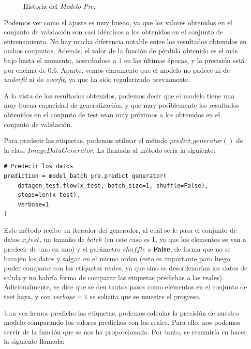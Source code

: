 \documentclass[11pt,a4paper]{article}
\begin{document}
\begin{figure}[H]
\begin{subfigure}{.5\textwidth}
    \label{fig:final-acc}
  \end{subfigure}
  \caption{Historia del \textit{Modelo Pre}.}
  \label{fig:history-final}
\end{figure}

Podemos ver como el ajuste es muy bueno, ya que los valores obtenidos en el conjunto de validación
son casi idénticos a los obtenidos en el conjunto de entrenamiento. No hay mucha diferencia notable
entre los resultados obtenidos en ambos conjuntos. Además, el valor de la función de pérdida obtenido es el más
bajo hasta el momento, acercándose a 1 en las últimas épocas, y la precisión está por encima de 0.6.
Aparte, vemos claramente que el modelo no padece ni de \textit{underfit} ni de \textit{overfit}, ya que
ha sido regularizado previamente.

A la vista de los resultados obtenidos, podemos decir que el modelo tiene una muy buena capacidad
de generalización, y que muy posiblemente los resultados obtenidos en el conjunto de test sean
muy próximos a los obtenidos en el conjunto de validación.

Para predecir las etiquetas, podemos utilizar el método $predict\_generator()$ de la clase
$ImageDataGenerator$. La llamada al método sería la siguiente:

\begin{lstlisting}
# Predecir los datos
prediction = model_batch_pre.predict_generator(
    datagen_test.flow(x_test, batch_size=1, shuffle=False),
    steps=len(x_test),
    verbose=1
)
\end{lstlisting}

Este método recibe un iterador del generador, al cuál se le pasa el conjunto de datos $x\_test$, un 
tamaño de \textit{batch} (en este caso es 1, ya que los elementos se van a predecir de uno en uno) y
el parámetro $shuffle$ a \textbf{False}, de forma que no se barajen los datos y salgan en el mismo orden
(esto es importante para luego poder comparar con las etiquetas reales, ya que sino se desordenarían
los datos de salida y no habría forma de comparar las etiquetas predichas a las reales). Adicionalmente,
se dice que se den tantos pasos como elementos en el conjunto de test haya, y con $verbose = 1$ se solicita
que se muestre el progreso.

Una vez hemos predicho las etiquetas, podemos calcular la precisión de nuestro modelo comparando los valores
predichos con los reales. Para ello, nos podemos servir de la función que se nos ha proporcionado. Por tanto,
se resumiría en hacer la siguiente llamada:
\end{document}
